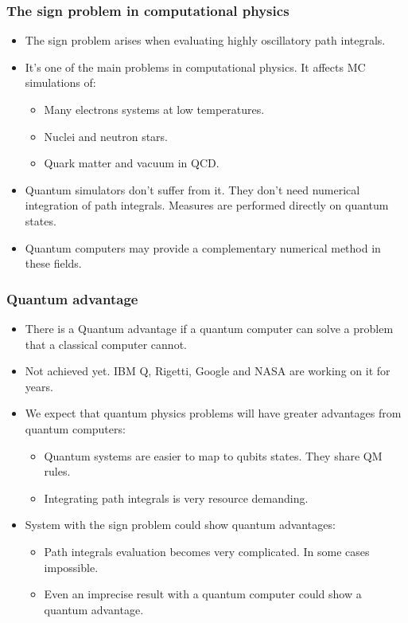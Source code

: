 \documentclass[11pt,t,xcolor=dvipsnames,aspectratio=169]{beamer}
\newlength\leftsidebar
\begin{document}
\begin{frame}
    \frametitle{The sign problem in computational physics}
    \begin{itemize}
        \item
            The sign problem arises when evaluating highly oscillatory path integrals.
        \item
            It's one of the main problems in computational physics.
            It affects MC simulations of:
            \begin{itemize}
                \item Many electrons systems at low temperatures.
                \item Nuclei and neutron stars.
                \item Quark matter and vacuum in QCD.
            \end{itemize}
        \item
            Quantum simulators don't suffer from it.
            They don't need numerical integration of path integrals.
            Measures are performed directly on quantum states.
        \item
            Quantum computers may provide a complementary numerical method in these fields.
    \end{itemize}
\end{frame}

\begin{frame}
    \frametitle{Quantum advantage}
    \begin{itemize}
        \item
            There is a Quantum advantage if a quantum computer can solve a problem that a classical computer cannot.
        \item
            Not achieved yet. IBM Q, Rigetti, Google and NASA are working on it for years.
        \item
            We expect that quantum physics problems will have greater advantages from quantum computers:
            \begin{itemize}
                \item Quantum systems are easier to map to qubits states. They share QM rules.
                \item Integrating path integrals is very resource demanding.
            \end{itemize}
        \item
            System with the sign problem could show quantum advantages:
            \begin{itemize}
                \item Path integrals evaluation becomes very complicated. In some cases impossible.
                \item Even an imprecise result with a quantum computer could show a quantum advantage.
            \end{itemize}
    \end{itemize}
\end{frame}

\leftsidebar
\begin{frame}[plain,t]
\titlepage
\end{frame}
\hoffset=0in %
\end{document}
